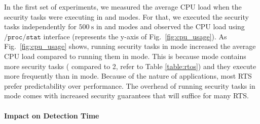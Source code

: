 \documentclass[../rt_server_main.tex]{subfiles}
\begin{document}
In the first set of experiments, we measured the average CPU load when the security tasks were executing in \pve and \ave modes. For that, we executed the security tasks independently for $500~\mathrm{s}$ in \pve and \ave modes and observed the CPU load using $\mathtt{/proc/stat}$ interface (represents the y-axis of Fig.~\ref{fig:cpu_usage}). As Fig.~\ref{fig:cpu_usage} shows, running security tasks in \ave mode increased the average CPU load compared to running them in \pve mode. This is because \ave mode contains more security tasks ( compared to 2, refer to %
Table \ref{table:rtos}) and they execute more frequently than in \pve mode. Because of the nature of applications, most RTS prefer predictability over performance. The overhead of running security tasks in \ave mode comes with increased security guarantees that will suffice for many RTS.




\paragraph{Impact on Detection Time}
\end{document}
